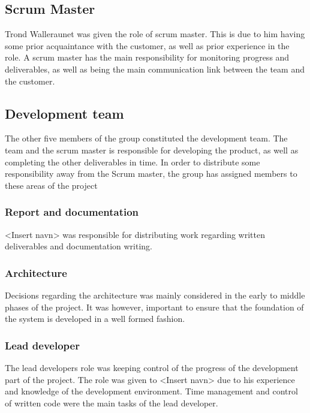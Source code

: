 \subsection{Scrum Master}

Trond Walleraunet was given the role of scrum master. This is due to him having some prior acquaintance with the customer, as well as prior experience in the role. A scrum master has the main responsibility for monitoring progress and deliverables, as well as being the main communication link between the team and the customer.

\subsection{Development team}

The other five members of the group constituted  the development team. The team and the scrum master is responsible for developing the product, as well as completing the other deliverables in time. In order to distribute some responsibility away from the Scrum master, the group has assigned members to these areas of the project

\subsubsection{Report and documentation}

<Insert navn> was responsible for distributing work regarding written deliverables and documentation writing.

\subsubsection{Architecture}

Decisions regarding the architecture was mainly considered in the early to middle phases of the project. It was however, important to ensure that the foundation of the system is developed in a well formed fashion.

\subsubsection{Lead developer}

The lead developers role was keeping control of the progress of the development part of the project. The role was given to <Insert navn> due to his experience and knowledge of the development environment. Time management and control of written code were the main tasks of the lead developer.

